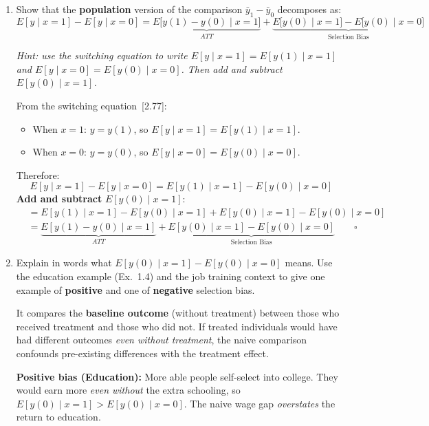 \documentclass[11pt,a4paper]{article}
\begin{document}
\begin{enumerate}[label=(\alph*)]
\item Show that the \textbf{population} version of the comparison $\bar{y}_1 - \bar{y}_0$ decomposes as:
\[
  E[y \mid x{=}1] - E[y \mid x{=}0]
  = \underbrace{E\bigl[y(1) - y(0) \mid x{=}1\bigr]}_{ATT}
  + \underbrace{E\bigl[y(0) \mid x{=}1\bigr] - E\bigl[y(0) \mid x{=}0\bigr]}_{\text{Selection Bias}}
\]

\textcolor{hintcolor}{\emph{Hint: use the switching equation to write $E[y \mid x{=}1] = E[y(1) \mid x{=}1]$ and $E[y \mid x{=}0] = E[y(0) \mid x{=}0]$. Then add and subtract $E[y(0) \mid x{=}1]$.}}

\begin{solution}
From the switching equation~[2.77]:
\begin{itemize}
  \item When $x = 1$: $y = y(1)$, so $E[y \mid x{=}1] = E[y(1) \mid x{=}1]$.
  \item When $x = 0$: $y = y(0)$, so $E[y \mid x{=}0] = E[y(0) \mid x{=}0]$.
\end{itemize}
Therefore:
\[
  E[y \mid x{=}1] - E[y \mid x{=}0] = E[y(1) \mid x{=}1] - E[y(0) \mid x{=}0]
\]
\textbf{Add and subtract} $E[y(0) \mid x{=}1]$:
\begin{align*}
  &= E[y(1) \mid x{=}1] - E[y(0) \mid x{=}1] + E[y(0) \mid x{=}1] - E[y(0) \mid x{=}0] \\[4pt]
  &= \underbrace{E[y(1) - y(0) \mid x{=}1]}_{ATT}
   + \underbrace{E[y(0) \mid x{=}1] - E[y(0) \mid x{=}0]}_{\text{Selection Bias}} \qquad\square
\end{align*}
\end{solution}

\item Explain in words what $E[y(0) \mid x{=}1] - E[y(0) \mid x{=}0]$ means. Use the education example (Ex.~1.4) and the job training context to give one example of \textbf{positive} and one of \textbf{negative} selection bias.

\begin{solution}
It compares the \textbf{baseline outcome} (without treatment) between those who received treatment and those who did not. If treated individuals would have had different outcomes \emph{even without treatment}, the naive comparison confounds pre-existing differences with the treatment effect.

\textbf{Positive bias (Education):} More able people self-select into college. They would earn more \emph{even without} the extra schooling, so $E[y(0) \mid x{=}1] > E[y(0) \mid x{=}0]$. The naive wage gap \emph{overstates} the return to education.


\end{solution}
\end{enumerate}
\end{document}
